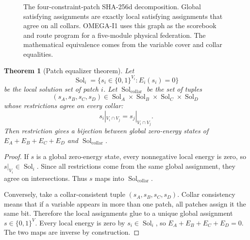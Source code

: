 \documentclass[11pt]{article}
\newtheorem{theorem}{Theorem}[section]
\theoremstyle{definition}
\theoremstyle{remark}
\newcommand{\bits}{\{0,1\}}
\newcommand{\Sol}{\operatorname{Sol}}
\begin{document}
\begin{figure}[t]
{
}
\caption{The four-constraint-patch SHA-256d decomposition. Global satisfying assignments
are exactly local satisfying assignments that agree on all collars. OMEGA-I1
uses this graph as the scorebook and route program for a five-module physical
federation. The mathematical equivalence comes from the variable cover and
collar equalities.}
\label{fig:fourpatch}
\end{figure}

\begin{theorem}[Patch equalizer theorem]
\label{thm:equalizer}
Let
\[
\Sol_i=\{s_i\in\bits^{V_i}:E_i(s_i)=0\}
\]
be the local solution set of patch \(i\). Let \(\Sol_{\mathrm{collar}}\) be
the set of tuples
\[
(s_A,s_B,s_C,s_D)\in
\Sol_A\times\Sol_B\times\Sol_C\times\Sol_D
\]
whose restrictions agree on every collar:
\[
s_i|_{V_i\cap V_j}=s_j|_{V_i\cap V_j}.
\]
Then restriction gives a bijection between global zero-energy states of
\(E_A+E_B+E_C+E_D\) and \(\Sol_{\mathrm{collar}}\).
\end{theorem}

\begin{proof}
If \(s\) is a global zero-energy state, every nonnegative local energy is zero,
so \(s|_{V_i}\in\Sol_i\). Since all restrictions come from the same global
assignment, they agree on intersections. Thus \(s\) maps into
\(\Sol_{\mathrm{collar}}\).

Conversely, take a collar-consistent tuple
\((s_A,s_B,s_C,s_D)\). Collar consistency means that if a variable appears in
more than one patch, all patches assign it the same bit. Therefore the local
assignments glue to a unique global assignment \(s\in\bits^V\). Every local
energy is zero by \(s_i\in\Sol_i\), so \(E_A+E_B+E_C+E_D=0\). The two maps are
inverse by construction.
\end{proof}
\end{document}
